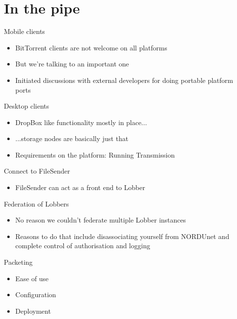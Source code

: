 \documentclass{beamer}
\begin{document}
\section{In the pipe}
\begin{frame}{Mobile clients}
  \begin{itemize}
  \item
    BitTorrent clients are not welcome on all platforms
  \item
    But we're talking to an important one
  \item
    Initiated discussions with external developers for doing portable
    platform ports
  \end{itemize}
\end{frame}
\begin{frame}{Desktop clients}
  \begin{itemize}
  \item
    DropBox like functionality mostly in place...
  \item
    ...storage nodes are basically just that
  \item
    Requirements on the platform: Running Transmission
  \end{itemize}
\end{frame}
\begin{frame}{Connect to FileSender}
  \begin{itemize}
  \item
    FileSender can act as a front end to Lobber
  \end{itemize}
\end{frame}
\begin{frame}{Federation of Lobbers}
  \begin{itemize}
  \item
    No reason we couldn't federate multiple Lobber instances
  \item
    Reasons to do that include disassociating yourself from NORDUnet
    and complete control of authorisation and logging
  \end{itemize}
\end{frame}
\begin{frame}{Packeting}
  \begin{itemize}
  \item
    Ease of use
  \item
    Configuration
  \item
    Deployment
  \end{itemize}
\end{frame}
\end{document}
